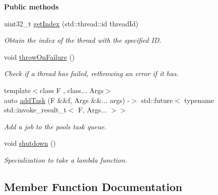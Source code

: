 \begin{Indent}\textbf{ Public methods}\par
\begin{DoxyCompactItemize}
\item 
\mbox{\label{classrev_1_1_thread_pool_abc9c37e36d4d0b895eda53b4708d0b60}} 
uint32\+\_\+t \mbox{\hyperlink{classrev_1_1_thread_pool_abc9c37e36d4d0b895eda53b4708d0b60}{get\+Index}} (std\+::thread\+::id thread\+Id)
\begin{DoxyCompactList}\small\item\em Obtain the index of the thread with the specified ID. \end{DoxyCompactList}\item 
\mbox{\label{classrev_1_1_thread_pool_a8eacc0a9e498e5e6a20fe841be8d1dc1}} 
void \mbox{\hyperlink{classrev_1_1_thread_pool_a8eacc0a9e498e5e6a20fe841be8d1dc1}{throw\+On\+Failure}} ()
\begin{DoxyCompactList}\small\item\em Check if a thread has failed, rethrowing an error if it has. \end{DoxyCompactList}\item 
\mbox{\label{classrev_1_1_thread_pool_ae98254768c80a90eaca5694894abc306}} 
{\footnotesize template$<$class F , class... Args$>$ }\\auto \mbox{\hyperlink{classrev_1_1_thread_pool_ae98254768c80a90eaca5694894abc306}{add\+Task}} (F \&\&f, Args \&\&... args) -\/$>$ std\+::future$<$ typename std\+::invoke\+\_\+result\+\_\+t$<$ F, Args... $>$$>$
\begin{DoxyCompactList}\small\item\em Add a job to the pool\textquotesingle{}s task queue. \end{DoxyCompactList}\item 
void \mbox{\hyperlink{classrev_1_1_thread_pool_a27a1665943f692ce27429a514e5ec209}{shutdown}} ()
\begin{DoxyCompactList}\small\item\em Specialization to take a lambda function. \end{DoxyCompactList}\end{DoxyCompactItemize}
\end{Indent}


\subsection{Member Function Documentation}
\mbox{\label{classrev_1_1_thread_pool_a27a1665943f692ce27429a514e5ec209}} 
